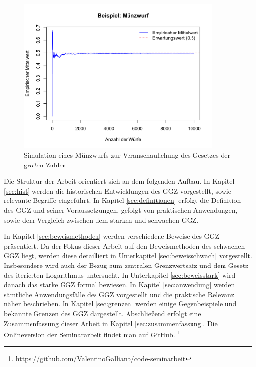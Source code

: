 \documentclass[aodsor,preprint]{imsart}
\numberwithin{equation}{section}
\theoremstyle{plain}
\begin{document}
\begin{figure}[h!]
  \centering
  \includegraphics[width=0.9\textwidth]{Muenzwurf.png}
  \caption{Simulation eines Münzwurfs zur Veranschaulichung des Gesetzes der großen Zahlen}
  \label{fig:muenzwurf}
\end{figure}

\newpage

Die Struktur der Arbeit orientiert sich an dem folgenden Aufbau.
In Kapitel \ref{sec:hist} werden die historischen Entwicklungen des GGZ vorgestellt, sowie relevante Begriffe eingeführt.
In Kapitel \ref{sec:definitionen} erfolgt die Definition des GGZ und seiner Voraussetzungen, gefolgt von praktischen Anwendungen, sowie dem Vergleich zwischen dem starken und schwachen GGZ.

In Kapitel \ref{sec:beweismethoden} werden verschiedene Beweise des GGZ präsentiert.
Da der Fokus dieser Arbeit auf den Beweismethoden des schwachen GGZ liegt, werden diese detailliert in Unterkapitel \ref{sec:beweisschwach} vorgestellt.
Insbesondere wird auch der Bezug zum zentralen Grenzwertsatz und dem Gesetz des iterierten Logarithmus untersucht.
In Unterkapitel \ref{sec:beweisstark} wird danach das starke GGZ formal bewiesen.
In Kapitel \ref{sec:anwendung} werden sämtliche Anwendungsfälle des GGZ vorgestellt und die praktische Relevanz näher beschrieben.
In Kapitel \ref{sec:grenzen} werden einige Gegenbeispiele und bekannte Grenzen des GGZ dargestellt. 
Abschließend erfolgt eine Zusammenfassung dieser Arbeit in Kapitel \ref{sec:zusammenfassung}.
Die Onlineversion der Seminararbeit findet man auf GitHub. \footnote{\url{https://github.com/ValentinoGalliano/code-seminarbeit}}
\end{document}
